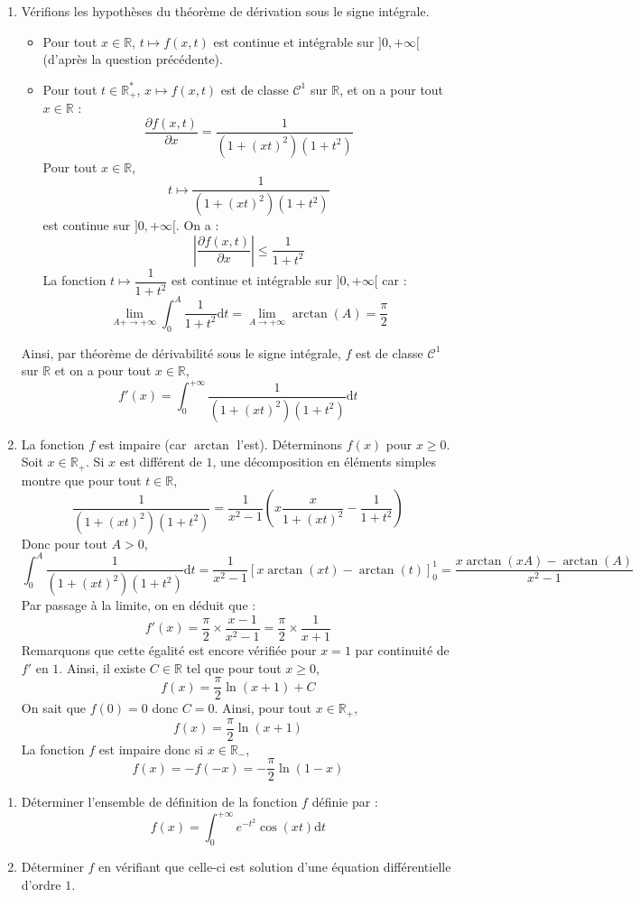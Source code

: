 \documentclass[a4paper,twoside,french,11pt]{VcCours}
\newcommand{\dt}{\text{d}t}
\begin{document}
\begin{enumerate}
\noindent Finalement, $f$ est définie sur $\mathbb{R}$.
\item Vérifions les hypothèses du théorème de dérivation sous le signe intégrale.
\begin{itemize}
\item Pour tout $x \in \mathbb{R}$, $t \mapsto f(x,t)$ est continue et intégrable sur $]0, + \infty[$ (d'après la question précédente).
\item Pour tout $t \in \mathbb{R}_+^{*}$, $x \mapsto f(x,t)$ est de classe $\mathcal{C}^1$ sur $\mathbb{R}$, et on a pour tout $x \in \mathbb{R}$ :
$$ \dfrac{\partial f(x,t)}{\partial x} = \dfrac{1}{(1+(xt)^2)(1+t^2)}$$
Pour tout $x \in \mathbb{R}$,
$$ t \mapsto \dfrac{1}{(1+(xt)^2)(1+t^2)}$$
est continue sur $]0,+ \infty[$. On a :
$$ \left\vert \dfrac{\partial f(x,t)}{\partial x} \right\vert \leq \dfrac{1}{1+t^2}$$
La fonction $t \mapsto \dfrac{1}{1+t^2}$ est continue et intégrable sur $]0, + \infty[$ car :
$$ \lim_{A + \rightarrow + \infty} \int_{0}^A \dfrac{1}{1+t^2} \dt = \lim_{A \rightarrow + \infty} \arctan(A) = \dfrac{\pi}{2}$$
\end{itemize}
Ainsi, par théorème de dérivabilité sous le signe intégrale, $f$ est de classe $\mathcal{C}^1$ sur $\mathbb{R}$ et on a pour tout $x \in \mathbb{R}$,
$$ f'(x) = \int_{0}^{+ \infty} \dfrac{1}{(1+(xt)^2)(1+t^2)} \dt$$
\item La fonction $f$ est impaire (car $\arctan$ l'est). Déterminons $f(x)$ pour $x \geq 0$. Soit $x \in \mathbb{R}_+$. Si $x$ est différent de $1$, une décomposition en éléments simples montre que pour tout $t \in \mathbb{R}$,
$$ \dfrac{1}{(1+(xt)^2)(1+t^2)} = \dfrac{1}{x^2-1} \left( x\dfrac{x}{1+(xt)^2} - \dfrac{1}{1+t^2} \right)$$
Donc pour tout $A>0$,
$$ \int_{0}^A \dfrac{1}{(1+(xt)^2)(1+t^2)} \dt = \dfrac{1}{x^2-1} [ x \arctan(xt)- \arctan(t) ]_0^1 = \dfrac{x\arctan(xA) - \arctan(A)}{x^2-1}$$
Par passage à la limite, on en déduit que :
$$ f'(x) = \dfrac{\pi}{2} \times \dfrac{x-1}{x^2-1} = \dfrac{\pi}{2} \times \dfrac{1}{x+1}$$
Remarquons que cette égalité est encore vérifiée pour $x=1$ par continuité de $f'$ en $1$. Ainsi, il existe $C \in \mathbb{R}$ tel que pour tout $x \geq 0$,
$$ f(x) = \dfrac{\pi}{2} \ln(x+1) + C$$
On sait que $f(0)=0$ donc $C=0$. Ainsi, pour tout $x \in \mathbb{R}_+$,
$$ f(x) = \dfrac{\pi}{2} \ln(x+1) $$
La fonction $f$ est impaire donc si $x \in \mathbb{R}_{-}$,
$$ f(x) = - f(-x) = -\dfrac{\pi}{2} \ln(1-x)$$
\end{enumerate}


\begin{Exercice}{}
\begin{enumerate}
\item Déterminer l'ensemble de définition de la fonction $f$ définie par :
$$ f(x) = \int_{0}^{+ \infty} e^{-t^2} \cos(xt) \dt$$
\item Déterminer $f$ en vérifiant que celle-ci est solution d'une équation différentielle d'ordre $1$.
\end{enumerate}
\end{Exercice}
\end{document}
